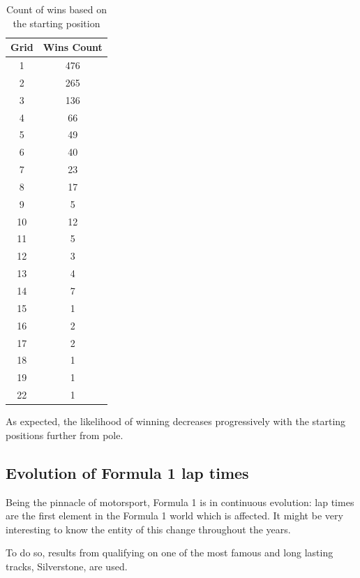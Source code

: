 \documentclass{Configuration_Files/PoliMi3i_thesis}
\begin{document}
\vspace{0.5cm}
\begin{table}[!h]
    \centering
    \begin{tabular}{|c|c|}
        \hline
        \textbf{Grid} & \textbf{Wins Count} \\
        \hline
        1 & 476 \\
        2 & 265 \\
        3 & 136 \\
        4 & 66 \\
        5 & 49 \\
        6 & 40 \\
        7 & 23 \\
        8 & 17 \\
        9 & 5 \\
        10 & 12 \\
        11 & 5 \\
        12 & 3 \\
        13 & 4 \\
        14 & 7 \\
        15 & 1 \\
        16 & 2 \\
        17 & 2 \\
        18 & 1 \\
        19 & 1 \\
        22 & 1 \\
        \hline
    \end{tabular}
    \caption{Count of wins based on the starting position}
\end{table}

As expected, the likelihood of winning decreases progressively with the starting positions further from pole.

\newpage
\subsection{Evolution of Formula 1 lap times}
Being the pinnacle of motorsport, Formula 1 is in continuous evolution: lap times are the first element in the Formula 1 world which is affected. It might be very interesting to know the entity of this change throughout the years.

To do so, results from qualifying on one of the most famous and long lasting tracks, Silverstone, are used.

\vspace{0.5cm}
\inputminted[frame=single,framesep=10pt,breaklines]{python}{formula1/queries/query5.py}
\end{document}
